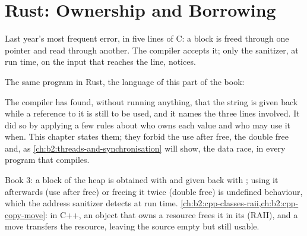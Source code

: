 \chapter{Rust: Ownership and Borrowing}\label{ch:b2:rust-ownership}

Last year's most frequent error, in five lines of C: a block is freed through one pointer and read through another.
The compiler accepts it; only the sanitizer, at run time, on the input that reaches the line, notices.

\label{lst:b2:rust-ownership:uaf-c}

\label{out:b2:rust-ownership:uaf-c}

The same program in Rust, the language of this part of the book:

\label{lst:b2:rust-ownership:uaf-rs}

\label{out:b2:rust-ownership:uaf-rs}

The compiler has found, without running anything, that the string is given back while a reference to it is still
to be used, and it names the three lines involved. It did so by applying a few rules about who owns each value and
who may use it when. This chapter states them; they forbid the use after free, the double free and, as
\cref{ch:b2:threads-and-synchronisation} will show, the data race, in every program that compiles.

\begin{recall}
Book 3: a block of the heap is obtained with  and given back with ; using it afterwards
(use after free) or freeing it twice (double free) is undefined behaviour, which the address sanitizer detects at
run time. \cref{ch:b2:cpp-classes-raii,ch:b2:cpp-copy-move}: in C++, an object that owns a resource frees it in its
 (RAII), and a move transfers the resource, leaving the source empty but still usable.
\end{recall}


